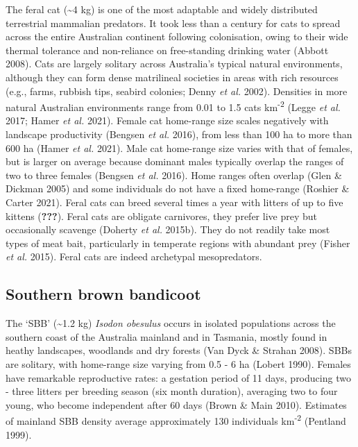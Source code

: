 \documentclass[11pt,a4paper,titlepage,twoside,openright]{style/unimelbthesis}
\begin{document}
\begin{mainmatter}
The feral cat (\textasciitilde4 kg) is one of the most adaptable and widely distributed terrestrial mammalian predators. It took less than a century for cats to spread across the entire Australian continent following colonisation, owing to their wide thermal tolerance and non-reliance on free-standing drinking water (Abbott 2008). Cats are largely solitary across Australia's typical natural environments, although they can form dense matrilineal societies in areas with rich resources (e.g., farms, rubbish tips, seabird colonies; Denny \emph{et al.} 2002). Densities in more natural Australian environments range from 0.01 to 1.5 cats km\textsuperscript{-2} (Legge \emph{et al.} 2017; Hamer \emph{et al.} 2021). Female cat home-range size scales negatively with landscape productivity (Bengsen \emph{et al.} 2016), from less than 100 ha to more than 600 ha (Hamer \emph{et al.} 2021). Male cat home-range size varies with that of females, but is larger on average because dominant males typically overlap the ranges of two to three females (Bengsen \emph{et al.} 2016). Home ranges often overlap (Glen \& Dickman 2005) and some individuals do not have a fixed home-range (Roshier \& Carter 2021). Feral cats can breed several times a year with litters of up to five kittens ({\textbf{???}}). Feral cats are obligate carnivores, they prefer live prey but occasionally scavenge (Doherty \emph{et al.} 2015b). They do not readily take most types of meat bait, particularly in temperate regions with abundant prey (Fisher \emph{et al.} 2015).
Feral cats are indeed archetypal mesopredators.

\hypertarget{southern-brown-bandicoot}{%
\subsection{Southern brown bandicoot}\label{southern-brown-bandicoot}}

The `SBB' (\textasciitilde1.2 kg) \emph{Isodon obesulus} occurs in isolated populations across the southern coast of the Australia mainland and in Tasmania, mostly found in heathy landscapes, woodlands and dry forests (Van Dyck \& Strahan 2008). SBBs are solitary, with home-range size varying from 0.5 - 6 ha (Lobert 1990). Females have remarkable reproductive rates: a gestation period of 11 days, producing two - three litters per breeding season (six month duration), averaging two to four young, who become independent after 60 days (Brown \& Main 2010). Estimates of mainland SBB density average approximately 130 individuals km\textsuperscript{-2} (Pentland 1999).


\end{mainmatter}
\end{document}
